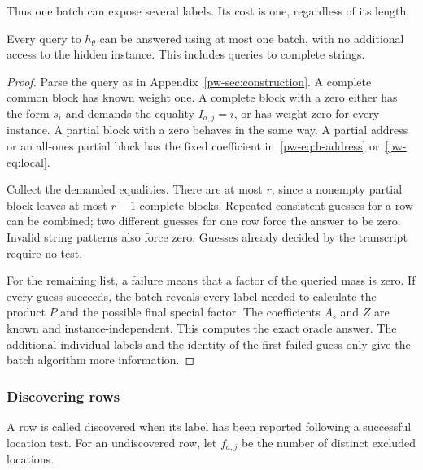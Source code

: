 Thus one batch can expose several labels. Its cost is one, regardless of its length.

\begin{lemma}[Simulation]\label{pw-lem:simulation}
Every query to $h_\theta$ can be answered using at most one batch, with no additional access to the hidden instance. This includes queries to complete strings.
\end{lemma}
\begin{proof}
Parse the query as in Appendix~\ref{pw-sec:construction}. A complete common block has known weight one. A complete block with a zero either has the form $s_i$ and demands the equality $I_{a,j}=i$, or has weight zero for every instance. A partial block with a zero behaves in the same way. A partial address or an all-ones partial block has the fixed coefficient in~\eqref{pw-eq:h-address} or~\eqref{pw-eq:local}.

Collect the demanded equalities. There are at most $r$, since a nonempty partial block leaves at most $r-1$ complete blocks. Repeated consistent guesses for a row can be combined; two different guesses for one row force the answer to be zero. Invalid string patterns also force zero. Guesses already decided by the transcript require no test.

For the remaining list, a failure means that a factor of the queried mass is zero. If every guess succeeds, the batch reveals every label needed to calculate the product $P$ and the possible final special factor. The coefficients $A_\circ$ and $Z$ are known and instance-independent. This computes the exact oracle answer. The additional individual labels and the identity of the first failed guess only give the batch algorithm more information.
\end{proof}

\subsubsection{Discovering rows}

A row is called discovered when its label has been reported following a successful location test. For an undiscovered row, let $f_{a,j}$ be the number of distinct excluded locations.

